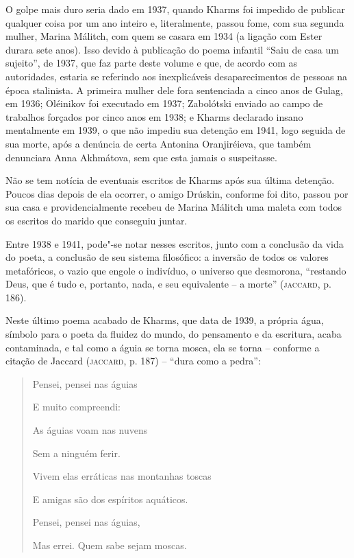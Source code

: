 O golpe mais duro seria dado em 1937, quando Kharms foi impedido de
publicar qualquer coisa por um ano inteiro e, literalmente, passou fome,
com sua segunda mulher, Marina Málitch, com quem se casara em 1934 (a
ligação com Ester durara sete anos). Isso devido à publicação do poema
infantil ``Saiu de casa um sujeito'', de 1937, que faz parte deste
volume e que, de acordo com as autoridades, estaria se referindo aos
inexplicáveis desaparecimentos de pessoas na época stalinista. A
primeira mulher dele fora sentenciada a cinco anos de Gulag, em 1936;
Oléinikov foi executado em 1937; Zabolótski enviado ao campo de
trabalhos forçados por cinco anos em 1938; e Kharms declarado insano
mentalmente em 1939, o que não impediu sua detenção em 1941, logo
seguida de sua morte, após a denúncia de certa Antonina Oranjiréieva,
que também denunciara Anna Akhmátova, sem que esta jamais o suspeitasse.

Não se tem notícia de eventuais escritos de Kharms após sua última
detenção. Poucos dias depois de ela ocorrer, o amigo Drúskin, conforme
foi dito, passou por sua casa e providencialmente recebeu de Marina
Málitch uma maleta com todos os escritos do marido que conseguiu juntar.

Entre 1938 e 1941, pode"-se notar nesses escritos, junto com a conclusão
da vida do poeta, a conclusão de seu sistema filosófico: a inversão de
todos os valores metafóricos, o vazio que engole o indivíduo, o universo
que desmorona, ``restando Deus, que é tudo e, portanto, nada, e seu
equivalente -- a morte'' (\textsc{jaccard}, p. 186).

Neste último poema acabado de Kharms, que data de 1939, a própria água,
símbolo para o poeta da fluidez do mundo, do pensamento e da escritura,
acaba contaminada, e tal como a águia se torna mosca, ela se torna --
conforme a citação de Jaccard (\textsc{jaccard}, p. 187) -- ``dura como
a pedra'':

\begin{quote}
Pensei, pensei nas águias

E muito compreendi:

As águias voam nas nuvens

Sem a ninguém ferir.

Vivem elas erráticas nas montanhas toscas

E amigas são dos espíritos aquáticos.

Pensei, pensei nas águias,

Mas errei. Quem sabe sejam moscas.
\end{quote}

